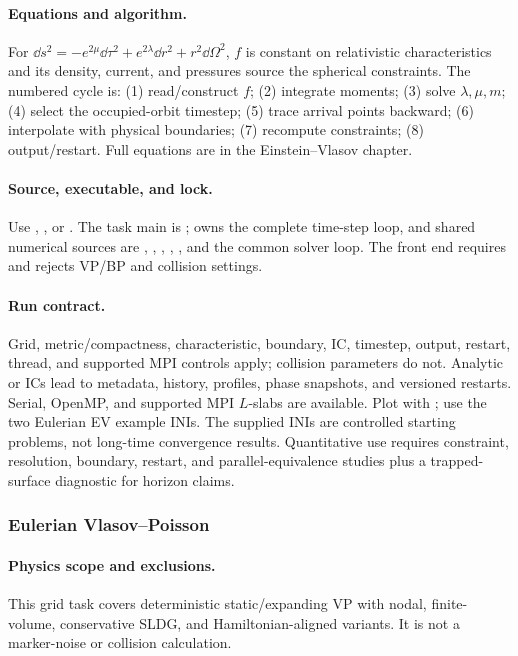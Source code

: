 \paragraph{Equations and algorithm.}
For \(\dd s^2=-e^{2\mu}\dd\tau^2+e^{2\lambda}\dd r^2+r^2\dd\Omega^2\), \(f\) is constant
on relativistic characteristics and its density, current, and pressures source
the spherical constraints.  The numbered cycle is: (1) read/construct \(f\);
(2) integrate moments; (3) solve \(\lambda,\mu,m\); (4) select the occupied-orbit
timestep; (5) trace arrival points backward; (6) interpolate with physical
boundaries; (7) recompute constraints; (8) output/restart.  Full equations are
in the Einstein--Vlasov chapter.
\paragraph{Source, executable, and lock.}
Use , , or
.  The task main is
;
 owns the complete time-step loop, and shared
numerical sources are
, ,
,
, , and the common solver loop.  The
front end requires  and rejects VP/BP and
collision settings.
\paragraph{Run contract.}
Grid, metric/compactness, characteristic, boundary, IC, timestep, output,
restart, thread, and supported MPI controls apply; collision parameters do
not.  Analytic or  ICs lead to metadata, history, profiles,
phase snapshots, and versioned restarts.  Serial, OpenMP, and supported MPI
\(L\)-slabs are available.  Plot with
; use the two Eulerian EV example INIs.
The supplied INIs are controlled starting problems, not long-time convergence
results.
Quantitative use requires constraint, resolution, boundary, restart, and
parallel-equivalence studies plus a trapped-surface diagnostic for horizon
claims.

\subsubsection{Eulerian Vlasov--Poisson}
\paragraph{Physics scope and exclusions.}
This grid task covers deterministic static/expanding VP with nodal,
finite-volume, conservative SLDG, and Hamiltonian-aligned variants.  It is not
a marker-noise or collision calculation.
